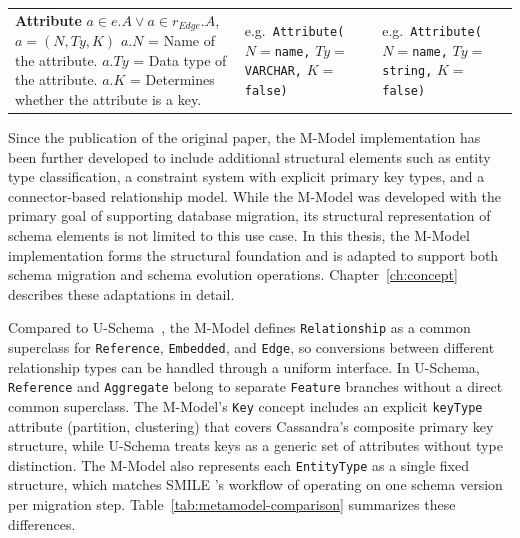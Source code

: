 \begin{longtable}{@{} >{\raggedright}p{5.0cm}
                        >{\raggedright}p{4.0cm}
                        >{\raggedright\arraybackslash}p{4.0cm} @{}}
  \textbf{Attribute}\newline
  $a \in e.A \vee a \in r_{Edge}.A$,\newline
  $a = (N, Ty, K)$\newline
  $a.N$ = Name of the attribute.\newline
  $a.Ty$ = Data type of the attribute.\newline
  $a.K$ = Determines whether the\newline
  \quad attribute is a key.
  &
  e.g.\ \texttt{Attribute(}\newline
  \quad $N{=}$\texttt{name,}\newline
  \quad $Ty{=}$\texttt{VARCHAR,}\newline
  \quad $K{=}$\texttt{false)}
  &
  e.g.\ \texttt{Attribute(}\newline
  \quad $N{=}$\texttt{name,}\newline
  \quad $Ty{=}$\texttt{string,}\newline
  \quad $K{=}$\texttt{false)}
  \\

  \end{longtable}

  \noindent\scriptsize

  \endgroup

 Since the publication of the original paper, the M-Model implementation has been further developed to include additional structural elements such as entity type classification, a constraint system with explicit primary key types, and a connector-based relationship model. While the M-Model was developed with the primary goal of supporting database migration, its structural representation of schema elements is not limited to this use case. In this thesis, the M-Model implementation forms the structural foundation and is adapted to support both schema migration and schema evolution operations. Chapter~\ref{ch:concept} describes these adaptations in detail.

  Compared to U-Schema~\cite{candel2022unified}, the M-Model defines
  \texttt{Relationship} as a common superclass for \texttt{Reference},
  \texttt{Embedded}, and \texttt{Edge}, so conversions between
  different relationship types can be handled through a uniform
  interface. In U-Schema, \texttt{Reference} and \texttt{Aggregate}
  belong to separate \texttt{Feature} branches without a direct common
  superclass. The M-Model's \texttt{Key} concept includes an explicit
  \texttt{keyType} attribute (partition, clustering) that covers
  Cassandra's composite primary key structure, while U-Schema treats
  keys as a generic set of attributes without type distinction. The
  M-Model also represents each \texttt{EntityType} as a single fixed
  structure, which matches SMILE 's workflow of operating on one schema
  version per migration step. Table~\ref{tab:metamodel-comparison}
  summarizes these differences.


